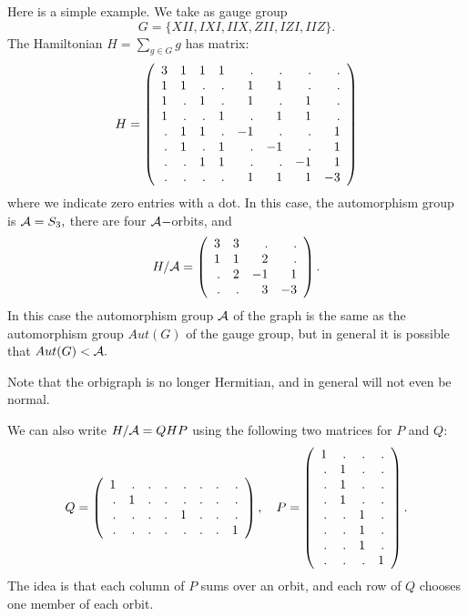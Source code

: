 \documentclass[12pt]{article}
\begin{document}
Here is a simple example. %
We take as gauge group 
$$G = \{XII, IXI, IIX, ZII, IZI, IIZ\}.$$
The Hamiltonian $H = \sum_{g\in G} g$ has matrix:
$$
H = \left(\begin{array}{rrrrrrrr}
 3 &  1 &  1 &  1 &  . &  . &  . &  . \cr
  1 &  1 &  . &  . &  1 &  1 &  . &  . \cr
  1 &  . &  1 &  . &  1 &  . &  1 &  . \cr
  1 &  . &  . &  1 &  . &  1 &  1 &  . \cr
  . &  1 &  1 &  . & -1 &  . &  . &  1 \cr
  . &  1 &  . &  1 &  . & -1 &  . &  1 \cr
  . &  . &  1 &  1 &  . &  . & -1 &  1 \cr
  . &  . &  . &  . &  1 &  1 &  1 & -3
\end{array}\right)
$$
where we indicate zero entries with a dot.
In this case, the automorphism group is $\mathcal{A}=S_3,$
there are four $\mathcal{A}-$orbits, and
$$
H/\mathcal{A} = \left(\begin{array}{rrrr}
 3 &  3 &  . &  . \cr
  1 &  1 &  2 &  . \cr
  . &  2 & -1 &  1 \cr
  . &  . &  3 & -3
\end{array}\right).
$$
In this case the automorphism group $\mathcal{A}$ of the graph
is the same as the automorphism group $Aut(G)$ of the gauge group,
but in general it is possible that $Aut(G) < \mathcal{A}.$

Note that the orbigraph is no longer Hermitian,
and in general will not even be normal.

We can also write $H/\mathcal{A} = QHP$ using the following two matrices for $P$ and $Q:$
$$
Q = 
\left(\begin{array}{rrrrrrrr}
 1 &  . &  . &  . &  . &  . &  . &  . \cr
  . &  1 &  . &  . &  . &  . &  . &  . \cr
  . &  . &  . &  . &  1 &  . &  . &  . \cr
  . &  . &  . &  . &  . &  . &  . &  1
\end{array}\right),\ \ \ 
P = 
\left(\begin{array}{rrrr}
 1 &  . &  . &  . \cr
  . &  1 &  . &  . \cr
  . &  1 &  . &  . \cr
  . &  1 &  . &  . \cr
  . &  . &  1 &  . \cr
  . &  . &  1 &  . \cr
  . &  . &  1 &  . \cr
  . &  . &  . &  1
\end{array}\right).
$$
The idea is that each column of $P$ sums over an orbit,
and each row of $Q$ chooses one member of each orbit.

\end{document}
